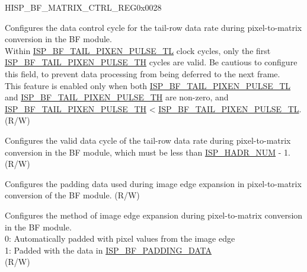 \begin{register}{H}{ISP\_BF\_MATRIX\_CTRL\_REG}{0x0028}\label{regdesc:ISPBFMATRIXCTRLREG}
%
%
%
%
%
\regnewline%
\begin{regdesc}\begin{reglist}
\label{fielddesc:ISPBFTAILPIXENPULSETL}\item [ISP\_BF\_TAIL\_PIXEN\_PULSE\_TL] Configures the data control cycle for the tail-row data rate during pixel-to-matrix conversion in the BF module.\\Within \hyperref[fielddesc:ISPBFTAILPIXENPULSETL]{ISP\_BF\_TAIL\_PIXEN\_PULSE\_TL} clock cycles, only the first \hyperref[fielddesc:ISPBFTAILPIXENPULSETH]{ISP\_BF\_TAIL\_PIXEN\_PULSE\_TH} cycles are valid. Be cautious to configure this field, to prevent data processing from being deferred to the next frame.\\This feature is enabled only when both \hyperref[fielddesc:ISPBFTAILPIXENPULSETL]{ISP\_BF\_TAIL\_PIXEN\_PULSE\_TL} and \hyperref[fielddesc:ISPBFTAILPIXENPULSETH]{ISP\_BF\_TAIL\_PIXEN\_PULSE\_TH} are non-zero, and \hyperref[fielddesc:ISPBFTAILPIXENPULSETH]{ISP\_BF\_TAIL\_PIXEN\_PULSE\_TH} < \hyperref[fielddesc:ISPBFTAILPIXENPULSETL]{ISP\_BF\_TAIL\_PIXEN\_PULSE\_TL}. (R/W)
\label{fielddesc:ISPBFTAILPIXENPULSETH}\item [ISP\_BF\_TAIL\_PIXEN\_PULSE\_TH] Configures the valid data cycle of the tail-row data rate during pixel-to-matrix conversion in the BF module, which must be less than \hyperref[fielddesc:ISPHADRNUM]{ISP\_HADR\_NUM} - 1. (R/W)
\label{fielddesc:ISPBFPADDINGDATA}\item [ISP\_BF\_PADDING\_DATA] Configures the padding data used during image edge expansion in pixel-to-matrix conversion of the BF module. (R/W)
\label{fielddesc:ISPBFPADDINGMODE}\item [ISP\_BF\_PADDING\_MODE] Configures the method of image edge expansion during pixel-to-matrix conversion in the BF module.\\0: Automatically padded with pixel values from the image edge\\1: Padded with the data in \hyperref[fielddesc:ISPBFPADDINGDATA]{ISP\_BF\_PADDING\_DATA}\\(R/W)
\end{reglist}\end{regdesc}
\end{register}


